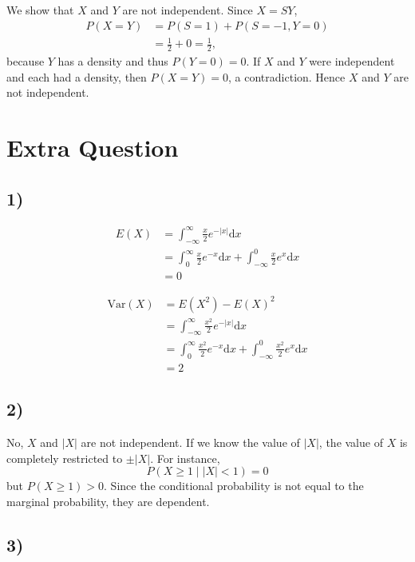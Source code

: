 \documentclass[a4paper, UTF-8]{article}
\theoremstyle{plain}
\begin{document}
We show that $X$ and $Y$ are not independent. 
Since $X=SY$,
\begin{align*}
P(X=Y) & = P(S=1) + P(S=-1, Y=0) \\
& = \tfrac{1}{2} + 0 = \tfrac{1}{2},
\end{align*}
because $Y$ has a density and thus $P(Y=0)=0$. If $X$ and $Y$ were independent and each had a density, then $P(X=Y)=0$, a contradiction. Hence $X$ and $Y$ are not independent.

\section{Extra Question} 

\subsection{1)} 

\begin{align*}
E(X) & = \int_{-\infty}^{\infty} \frac{x}{2} e^{-|x|} \mathrm{d}x \\
& = \int_{0}^{\infty} \frac{x}{2} e^{-x} \mathrm{d}x + \int_{-\infty}^{0} \frac{x}{2} e^{x} \mathrm{d}x \\
& = 0
\end{align*}

\begin{align*}
\text{Var}(X) & = E(X^2) - E(X)^2 \\
& = \int_{-\infty}^{\infty} \frac{x^2}{2} e^{-|x|} \mathrm{d}x \\
& = \int_{0}^{\infty} \frac{x^2}{2} e^{-x} \mathrm{d}x + \int_{-\infty}^{0} \frac{x^2}{2} e^{x} \mathrm{d}x \\
& = 2
\end{align*}

\subsection{2)} 

No, $X$ and $|X|$ are not independent. If we know the value of $|X|$, the value of $X$ is completely restricted to $\pm |X|$. For instance, 
$$ P(X \ge 1 \mid |X| < 1) = 0 $$
but $P(X \ge 1) > 0$. Since the conditional probability is not equal to the marginal probability, they are dependent.

\subsection{3)} 
\end{document}
